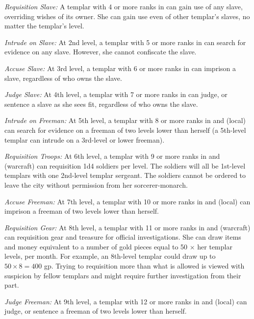 



\textit{Requisition Slave:} A templar with 4 or more ranks in  can gain use of any slave, overriding wishes of its owner. She can gain use even of other templar's slaves, no matter the templar's level.

\textit{Intrude on Slave:} At 2nd level, a templar with 5 or more ranks in  can search for evidence on any slave. However, she cannot confiscate the slave.

\textit{Accuse Slave:} At 3rd level, a templar with 6 or more ranks in  can imprison a slave, regardless of who owns the slave.

\textit{Judge Slave:} At 4th level, a templar with 7 or more ranks in  can judge, or sentence a slave as she sees fit, regardless of who owns the slave.

\textit{Intrude on Freeman:} At 5th level, a templar with 8 or more ranks in  and  (local) can search for evidence on a freeman of two levels lower than herself (a 5th-level templar can intrude on a 3rd-level or lower freeman).

\textit{Requisition Troops:} At 6th level, a templar with 9 or more ranks in  and  (warcraft) can requisition 1d4 soldiers per level. The soldiers will all be 1st-level templars with one 2nd-level templar sergeant. The soldiers cannot be ordered to leave the city without permission from her sorcerer-monarch.

\textit{Accuse Freeman:} At 7th level, a templar with 10 or more ranks in  and  (local) can imprison a freeman of two levels lower than herself.

\textit{Requisition Gear:} At 8th level, a templar with 11 or more ranks in  and  (warcraft) can requisition gear and treasure for official investigations. She can draw items and money equivalent to a number of gold pieces equal to 50 $\times$ her templar levels, per month. For example, an 8th-level templar could draw up to $50\times8=400$ gp. Trying to requisition more than what is allowed is viewed with suspicion by fellow templars and might require further investigation from their part.

\textit{Judge Freeman:} At 9th level, a templar with 12 or more ranks in  and  (local) can judge, or sentence a freeman of two levels lower than herself.

